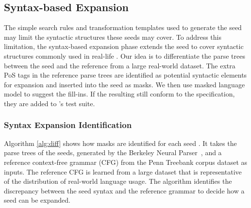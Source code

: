 \subsection{Syntax-based \Sent Expansion}

The simple search rules and transformation templates used to generate
the seed \sents may limit the syntactic structures these seeds may
cover. To address this limitation, the syntax-based \sent expansion
phase extends the seed \sents to cover syntactic structures commonly
used in real-life \sents. Our idea is to differentiate the parse trees
between the seed \sents and the reference \sents from a large
real-world dataset. The extra PoS tags in the reference parse trees
are identified as potential syntactic elements for expansion and
inserted into the seed \sents as masks. We then use masked language
model to suggest the fill-ins. If the resulting \sents still conform
to the \lc specification, they are added to \tool{}'s test suite.

\subsubsection{Syntax Expansion Identification}

Algorithm \ref{alg:diff} shows how masks are identified for each seed
\sent.  It takes the parse trees of the seeds, generated by the
Berkeley Neural
Parser~\cite{kitaev2018seedparser,kitaev2019seedparser}, and a
reference context-free grammar (CFG) from the Penn Treebank corpus
dataset \cite{} as inputs.  The reference CFG is learned from a large
dataset \cite{} that is representative of the distribution of
real-world language usage.  The algorithm identifies the discrepancy
between the seed syntax and the reference grammar to decide how a seed
can be expanded.



